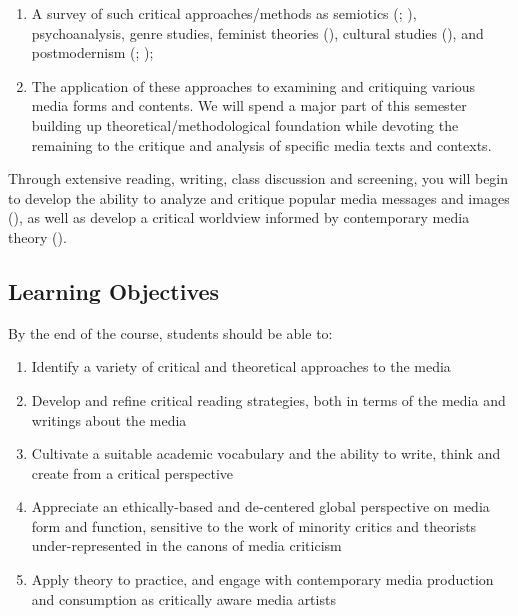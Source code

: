 \documentclass[
  letterpaper,
  DIV=11,
  numbers=noendperiod]{scrartcl}
\providecommand{\tightlist}{%
  \setlength{\itemsep}{0pt}\setlength{\parskip}{0pt}}
\begin{document}
\begin{enumerate}
\def\labelenumi{\arabic{enumi}.}
\item
  A survey of such critical approaches/methods as semiotics
  (;
  ), psychoanalysis,
  genre studies, feminist theories
  (),
  cultural studies (), and
  postmodernism (; );
\item
  The application of these approaches to examining and critiquing
  various media forms and contents. We will spend a major part of this
  semester building up theoretical/methodological foundation while
  devoting the remaining to the critique and analysis of specific media
  texts and contexts.
\end{enumerate}

Through extensive reading, writing, class discussion and screening, you
will begin to develop the ability to analyze and critique popular media
messages and images (), as
well as develop a critical worldview informed by contemporary media
theory ().

\subsection{Learning Objectives}\label{learning-objectives}

By the end of the course, students should be able to:

\begin{enumerate}
\def\labelenumi{\arabic{enumi}.}
\tightlist
\item
  Identify a variety of critical and theoretical approaches to the media
\item
  Develop and refine critical reading strategies, both in terms of the
  media and writings about the media
\item
  Cultivate a suitable academic vocabulary and the ability to write,
  think and create from a critical perspective
\item
  Appreciate an ethically-based and de-centered global perspective on
  media form and function, sensitive to the work of minority critics and
  theorists under-represented in the canons of media criticism
\item
  Apply theory to practice, and engage with contemporary media
  production and consumption as critically aware media artists
\end{enumerate}
\end{document}
